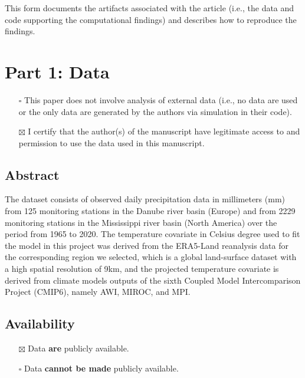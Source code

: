 \documentclass[
]{article}
\author{}
\date{\vspace{-2.5em}}
\providecommand{\tightlist}{%
  \setlength{\itemsep}{0pt}\setlength{\parskip}{0pt}}
\begin{document}
This form documents the artifacts associated with the article (i.e., the
data and code supporting the computational findings) and describes how
to reproduce the findings.

\section{Part 1: Data}\label{part-1-data}

\begin{itemize}
\tightlist
\item[$\square$]
  This paper does not involve analysis of external data (i.e., no data
  are used or the only data are generated by the authors via simulation
  in their code).
\end{itemize}

\begin{itemize}
\tightlist
\item[$\boxtimes$]
  I certify that the author(s) of the manuscript have legitimate access
  to and permission to use the data used in this manuscript.
\end{itemize}

\subsection{Abstract}\label{abstract}

The dataset consists of observed daily precipitation data in millimeters
(mm) from 125 monitoring stations in the Danube river basin (Europe) and
from 2229 monitoring stations in the Mississippi river basin (North
America) over the period from 1965 to 2020. The temperature covariate in
Celsius degree used to fit the model in this project was derived from
the ERA5-Land reanalysis data for the corresponding region we selected,
which is a global land-surface dataset with a high spatial resolution of
9km, and the projected temperature covariate is derived from climate
models outputs of the sixth Coupled Model Intercomparison Project
(CMIP6), namely AWI, MIROC, and MPI.

\subsection{Availability}\label{availability}

\begin{itemize}
\tightlist
\item[$\boxtimes$]
  Data \textbf{are} publicly available.
\item[$\square$]
  Data \textbf{cannot be made} publicly available.
\end{itemize}
\end{document}
